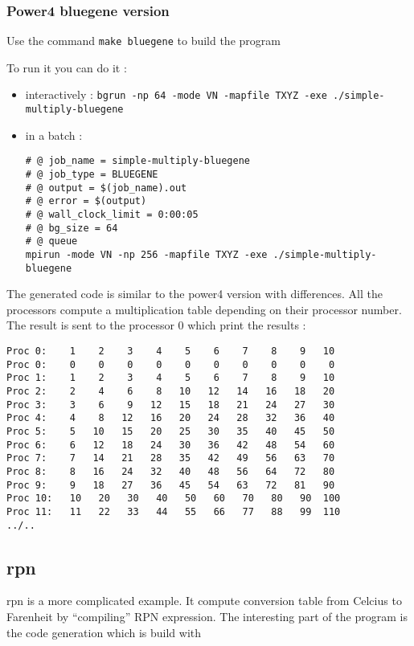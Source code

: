 \documentclass{article}
\begin{document}
\subsubsection{Power4 bluegene version}

Use the command \texttt{make bluegene} to build the program

To run it you can do it  :
\begin{itemize}
\item interactively : \texttt{bgrun -np 64 -mode VN -mapfile TXYZ -exe
    ./simple-multiply-bluegene}

\item in a batch :
\begin{verbatim}
# @ job_name = simple-multiply-bluegene
# @ job_type = BLUEGENE
# @ output = $(job_name).out
# @ error = $(output)
# @ wall_clock_limit = 0:00:05
# @ bg_size = 64
# @ queue
mpirun -mode VN -np 256 -mapfile TXYZ -exe ./simple-multiply-bluegene
\end{verbatim}
\end{itemize}

The generated code is similar to the power4 version with
differences. All the processors compute a multiplication table
depending on their processor number. The result is sent to the
processor 0 which print the results :

\begin{verbatim}
Proc 0:    1    2    3    4    5    6    7    8    9   10 
Proc 0:    0    0    0    0    0    0    0    0    0    0 
Proc 1:    1    2    3    4    5    6    7    8    9   10 
Proc 2:    2    4    6    8   10   12   14   16   18   20 
Proc 3:    3    6    9   12   15   18   21   24   27   30 
Proc 4:    4    8   12   16   20   24   28   32   36   40 
Proc 5:    5   10   15   20   25   30   35   40   45   50 
Proc 6:    6   12   18   24   30   36   42   48   54   60 
Proc 7:    7   14   21   28   35   42   49   56   63   70 
Proc 8:    8   16   24   32   40   48   56   64   72   80 
Proc 9:    9   18   27   36   45   54   63   72   81   90 
Proc 10:   10   20   30   40   50   60   70   80   90  100 
Proc 11:   11   22   33   44   55   66   77   88   99  110 
../..
\end{verbatim}

\subsection{rpn}

rpn is a more complicated example. It compute conversion table from
Celcius to Farenheit by ``compiling'' RPN expression. The interesting
part of the program is the code generation which is build with 
\end{document}
